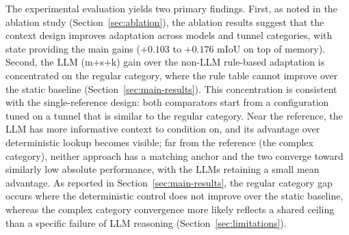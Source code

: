 \documentclass[a4paper,fleqn]{cas-dc}
\begin{document}
The experimental evaluation yields two primary findings. First, as noted in the ablation study (Section~\ref{sec:ablation}), the ablation results suggest that the context design improves adaptation across models and tunnel categories, with state providing the main gains ($+0.103$ to $+0.176$ mIoU on top of memory). Second, the LLM (m+s+k) gain over the non-LLM rule-based adaptation is concentrated on the regular category, where the rule table cannot improve over the static baseline (Section~\ref{sec:main-results}). This concentration is consistent with the single-reference design: both comparators start from a configuration tuned on a tunnel that is similar to the regular category. Near the reference, the LLM has more informative context to condition on, and its advantage over deterministic lookup becomes visible; far from the reference (the complex category), neither approach has a matching anchor and the two converge toward similarly low absolute performance, with the LLMs retaining a small mean advantage. As reported in Section~\ref{sec:main-results}, the regular category gap occurs where the deterministic control does not improve over the static baseline, whereas the complex category convergence more likely reflects a shared ceiling than a specific failure of LLM reasoning (Section~\ref{sec:limitations}).
\end{document}
